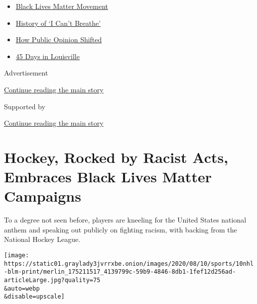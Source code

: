 \begin{itemize}
\tightlist
\item
  \href{https://www.nytimes3xbfgragh.onion/interactive/2020/07/03/us/george-floyd-protests-crowd-size.html?name=styln-george-floyd\&region=TOP_BANNER\&variant=undefined\&block=storyline_menu_recirc\&action=click\&pgtype=Article\&impression_id=434de880-e38b-11ea-8c52-fd2265771867}{Black
  Lives Matter Movement}
\item
  \href{https://www.nytimes3xbfgragh.onion/interactive/2020/06/28/us/i-cant-breathe-police-arrest.html?name=styln-george-floyd\&region=TOP_BANNER\&variant=undefined\&block=storyline_menu_recirc\&action=click\&pgtype=Article\&impression_id=434de881-e38b-11ea-8c52-fd2265771867}{History
  of `I Can't Breathe'}
\item
  \href{https://www.nytimes3xbfgragh.onion/interactive/2020/06/10/upshot/black-lives-matter-attitudes.html?name=styln-george-floyd\&region=TOP_BANNER\&variant=undefined\&block=storyline_menu_recirc\&action=click\&pgtype=Article\&impression_id=434de882-e38b-11ea-8c52-fd2265771867}{How
  Public Opinion Shifted}
\item
  \href{https://www.nytimes3xbfgragh.onion/interactive/2020/07/16/us/black-lives-matter-protests-louisville-breonna-taylor.html?name=styln-george-floyd\&region=TOP_BANNER\&variant=undefined\&block=storyline_menu_recirc\&action=click\&pgtype=Article\&impression_id=434de883-e38b-11ea-8c52-fd2265771867}{45
  Days in Louisville}
\end{itemize}

Advertisement

\protect\hyperlink{after-top}{Continue reading the main story}

Supported by

\protect\hyperlink{after-sponsor}{Continue reading the main story}

\hypertarget{hockey-rocked-by-racist-acts-embraces-black-lives-matter-campaigns}{%
\section{Hockey, Rocked by Racist Acts, Embraces Black Lives Matter
Campaigns}\label{hockey-rocked-by-racist-acts-embraces-black-lives-matter-campaigns}}

To a degree not seen before, players are kneeling for the United States
national anthem and speaking out publicly on fighting racism, with
backing from the National Hockey League.

\texttt{[image: https://static01.graylady3jvrrxbe.onion/images/2020/08/10/sports/10nhl-blm-print/merlin\_175211517\_4139799c-59b9-4846-8db1-1fef12d256ad-articleLarge.jpg?quality=75\\\&auto=webp\\\&disable=upscale]}

